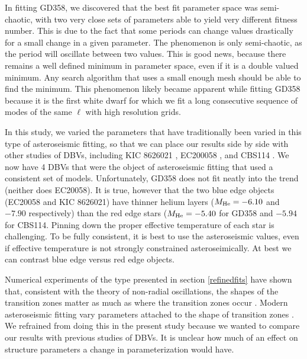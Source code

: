 \documentclass[12pt,preprint]{aastex}
\begin{document}
In fitting GD358, we discovered that the best fit parameter space was semi-chaotic, with two very close sets of 
parameters able to yield very different fitness number. This is due to the fact that some periods can change values 
drastically for a small change in a given parameter. The phenomenon is only semi-chaotic, as the period will oscillate 
between two values. This is good news, because there remains a well defined minimum in parameter space, even if it is a 
double valued minimum. Any search algorithm that uses a small enough mesh should be able to find the minimum. This 
phenomenon likely became apparent while fitting GD358 because it is the first white dwarf for which we fit a long 
consecutive sequence of modes of the same $\ell$ with high resolution grids.

In this study, we varied the parameters that have traditionally been varied in this type of asteroseismic fitting, so 
that we can place our results side by side with other studies of DBVs, including KIC 8626021 \citep{Bischoff-Kim14}, 
EC200058 \citep{Bischoff-Kim11a}, and CBS114 \citep{Metcalfe05a}. We now have 4 DBVs that were the object of 
asteroseismic fitting that used a consistent set of models. Unfortunately, GD358 does not fit neatly into the 
trend (neither does EC20058). It is true, however that the two blue edge objects (EC20058 and KIC 8626021) have 
thinner helium layers ($M_{\rm He}=-6.10$ and $-7.90$ respectively) than the red edge stars ($M_{\rm He}=-5.40$ for 
GD358 and $-5.94$ for CBS114. Pinning down the proper effective temperature of each star is challenging. To be 
fully consistent, it is best to use the asteroseismic values, even if effective temperature is not strongly 
constrained asteroseimically. At best we can contrast blue edge versus red edge objects.

Numerical experiments of the type presented in section \ref{refinedfits} have shown that, consistent with 
the theory of non-radial oscillations, the shapes of the transition zones matter as much as where the transition 
zones occur \citep{Bischoff-Kim15}. Modern asteroseismic fitting vary parameters attached to the shape of 
transition zones \citep{Giammichele15}. We refrained from doing this in the present study because we wanted 
to compare our results with previous studies of DBVs. It is unclear how much of an effect on structure 
parameters a change in parameterization would have.
\end{document}
